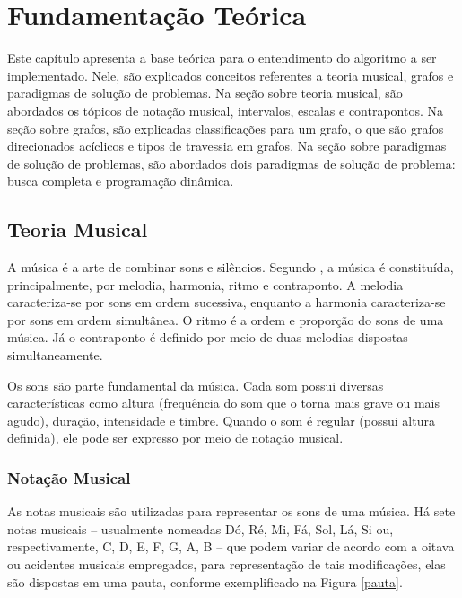 \chapter[Fundamentação Teórica]{Fundamentação Teórica}

  Este capítulo apresenta a base teórica para o entendimento do algoritmo a ser implementado. Nele, são explicados conceitos referentes a teoria musical, grafos e paradigmas de solução de problemas. Na seção sobre teoria musical, são abordados os tópicos de notação musical, intervalos, escalas e contrapontos. Na seção sobre grafos, são explicadas classificações para um grafo, o que são grafos direcionados acíclicos e tipos de travessia em grafos. Na seção sobre paradigmas de solução de problemas, são abordados dois paradigmas de solução de problema: busca completa e programação dinâmica.

  \section[Teoria Musical]{Teoria Musical}

    A música é a arte de combinar sons e silêncios. Segundo , a música é constituída, principalmente, por melodia, harmonia, ritmo e contraponto. A melodia caracteriza-se por sons em ordem sucessiva, enquanto a harmonia caracteriza-se por sons em ordem simultânea. O ritmo é a ordem e proporção do sons de uma música. Já o contraponto é definido por meio de duas melodias dispostas simultaneamente.

    Os sons são parte fundamental da música. Cada som possui diversas características como altura (frequência do som que o torna mais grave ou mais agudo), duração, intensidade e timbre. Quando o som é regular (possui altura definida), ele pode ser expresso por meio de notação musical.

    \subsection[Notação Musical]{Notação Musical}

      As notas musicais são utilizadas para representar os sons de uma música. Há sete notas musicais -- usualmente nomeadas Dó, Ré, Mi, Fá, Sol, Lá, Si ou, respectivamente, C, D, E, F, G, A, B -- que podem variar de acordo com a oitava ou acidentes musicais empregados, para representação de tais modificações, elas são dispostas em uma pauta, conforme exemplificado na Figura \ref{pauta}.

